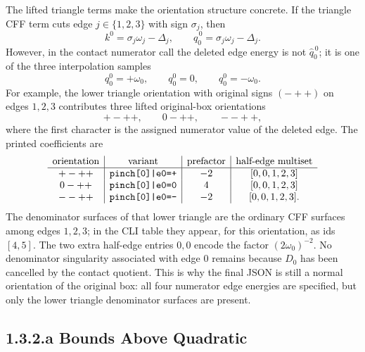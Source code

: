 \documentclass[11pt,a4paper]{report}
\begin{document}
The lifted triangle terms make the orientation structure concrete.  If the
triangle CFF term cuts edge \(j\in\{1,2,3\}\) with sign \(\sigma_j\), then
\[
  k^0=\sigma_j\omega_j-\Delta_j,\qquad
  \widehat q_0^{\,0}=\sigma_j\omega_j-\Delta_j .
\]
However, in the contact numerator call the deleted edge energy is not
\(\widehat q_0^{\,0}\); it is one of the three interpolation samples
\[
  q_0^0=+\omega_0,\qquad q_0^0=0,\qquad q_0^0=-\omega_0 .
\]
For example, the lower triangle orientation with original signs
\((-++ )\) on edges \(1,2,3\) contributes three lifted original-box
orientations
\[
  +-++,\qquad 0-++,\qquad --++ ,
\]
where the first character is the assigned numerator value of the deleted edge.
The printed coefficients are
\[
\begin{array}{c|c|c|c}
\hbox{orientation} & \hbox{variant} & \hbox{prefactor} &
       \hbox{half-edge multiset}\\
\hline
+-++ & \texttt{pinch[0]|e0=+} & -2 & [0,0,1,2,3]\\
0-++ & \texttt{pinch[0]|e0=0} & 4 & [0,0,1,2,3]\\
--++ & \texttt{pinch[0]|e0=-} & -2 & [0,0,1,2,3].
\end{array}
\]
The denominator surfaces of that lower triangle are the ordinary CFF
surfaces among edges \(1,2,3\); in the CLI table they appear, for this
orientation, as ids \([4,5]\).  The two extra half-edge entries \(0,0\) encode
the factor \((2\omega_0)^{-2}\).  No denominator singularity associated with
edge \(0\) remains because \(D_0\) has been cancelled by the contact quotient.
This is why the final JSON is still a normal orientation of the original box:
all four numerator edge energies are specified, but only the lower triangle
denominator surfaces are present.

\subsection*{1.3.2.a Bounds Above Quadratic}
\end{document}
